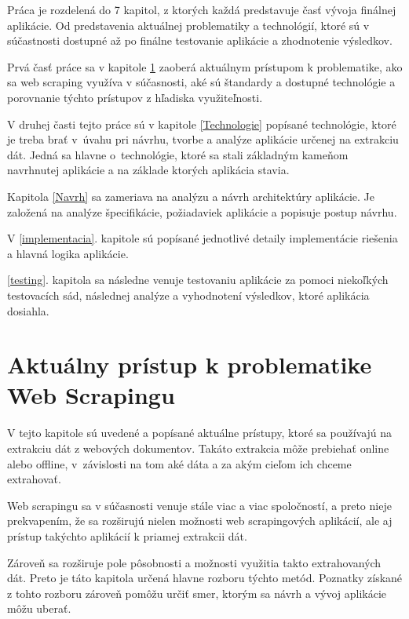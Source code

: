 \newpage

Práca je rozdelená do 7 kapitol, z ktorých každá predstavuje časť vývoja finálnej aplikácie. Od predstavenia aktuálnej problematiky a technológií, ktoré sú v súčastnosti dostupné až po finálne testovanie aplikácie a zhodnotenie výsledkov.

\bigskip

Prvá časť práce sa v kapitole \ref{aktualny_pristup} zaoberá aktuálnym prístupom k problematike, ako sa web scraping využíva v súčasnosti, aké sú štandardy a dostupné technológie a porovnanie týchto prístupov z hľadiska využiteľnosti.

V druhej časti tejto práce sú v kapitole \ref{Technologie} popísané technológie, ktoré je treba brať \mbox{v úvahu} pri návrhu, tvorbe a analýze aplikácie určenej na extrakciu dát. Jedná sa hlavne o~technológie, ktoré sa stali základným kameňom navrhnutej aplikácie a na základe ktorých aplikácia stavia.

Kapitola \ref{Navrh} sa zameriava na analýzu a návrh architektúry aplikácie. Je založená na analýze špecifikácie, požiadaviek aplikácie a popisuje postup návrhu.

V \ref{implementacia}. kapitole sú popísané jednotlivé detaily implementácie riešenia a hlavná logika aplikácie.

\ref{testing}. kapitola sa následne venuje testovaniu aplikácie za pomoci niekoľkých testovacích sád, následnej analýze a vyhodnotení výsledkov, ktoré aplikácia dosiahla.


\chapter{Aktuálny prístup k problematike Web Scrapingu}
\label{aktualny_pristup}

V tejto kapitole sú uvedené a popísané aktuálne prístupy, ktoré sa používajú na extrakciu dát z webových dokumentov. Takáto extrakcia môže prebiehať online alebo offline, v~závislosti na tom aké dáta a za akým cieľom ich chceme extrahovať.

Web scrapingu sa v súčasnosti venuje stále viac a viac spoločností, a preto nieje prekvapením, že sa rozširujú nielen možnosti web scrapingových aplikácií, ale aj prístup takýchto aplikácií k priamej extrakcii dát.

Zároveň sa rozširuje pole pôsobnosti a možnosti využitia takto extrahovaných dát. Preto je táto kapitola určená hlavne rozboru týchto metód. Poznatky získané z tohto rozboru zároveň pomôžu určiť smer, ktorým sa návrh a vývoj aplikácie môžu uberať. 

